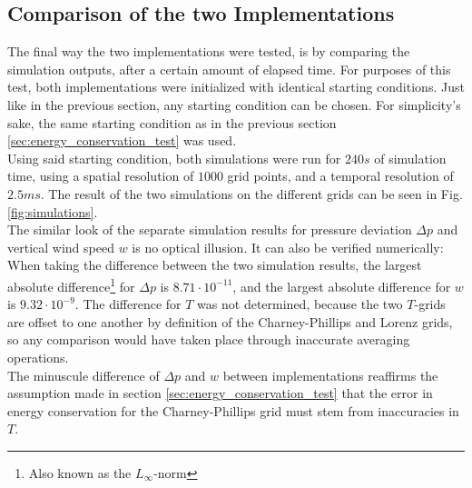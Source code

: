 \subsection{Comparison of the two Implementations}
The final way the two implementations were tested, is by comparing the simulation outputs, after a certain amount of elapsed time.
For purposes of this test, both implementations were initialized with identical starting conditions.
Just like in the previous section, any starting condition can be chosen.
For simplicity's sake, the same starting condition as in the previous section \ref{sec:energy_conservation_test} was used.\\
Using said starting condition, both simulations were run for $240s$ of simulation time, using a spatial resolution of $1000$ grid points, and a temporal resolution of $2.5ms$.
The result of the two simulations on the different grids can be seen in Fig. \ref{fig:simulations}.\\
The similar look of the separate simulation results for pressure deviation $\Delta p$ and vertical wind speed $w$ is no optical illusion.
It can also be verified numerically:
When taking the difference between the two simulation results, the largest absolute difference\footnote{Also known as the $L_\infty$-norm} for $\Delta p$ is $8.71\cdot 10^{-11}$, and the largest absolute difference for $w$ is $9.32\cdot 10^{-9}$.
The difference for $T$ was not determined, because the two $T$-grids are offset to one another by definition of the Charney-Phillips and Lorenz grids, so any comparison would have taken place through inaccurate averaging operations.\\
The minuscule difference of $\Delta p$ and $w$ between implementations reaffirms the assumption made in section \ref{sec:energy_conservation_test} that the error in energy conservation for the Charney-Phillips grid must stem from inaccuracies in $T$.

